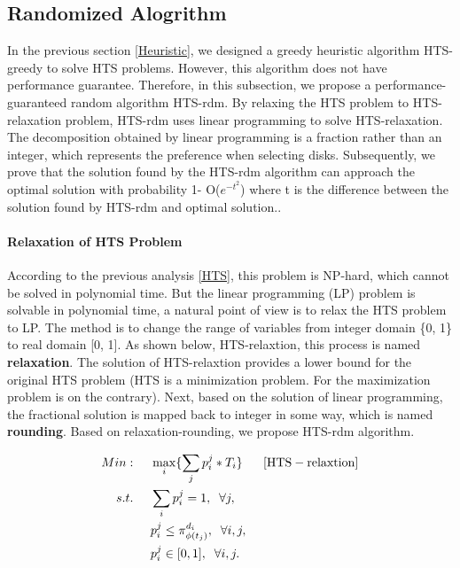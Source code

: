 \documentclass[conference]{IEEEtran}
\begin{document}
\subsection{Randomized Alogrithm}\label{Randomized}

In the previous section \ref{Heuristic}, we designed a greedy heuristic algorithm HTS-greedy to solve HTS problems. However, this algorithm does not have performance guarantee. Therefore, in this subsection, we propose a performance-guaranteed random algorithm HTS-rdm. By relaxing the HTS problem to HTS-relaxation problem, HTS-rdm uses linear programming to solve HTS-relaxation. The decomposition obtained by linear programming is a fraction rather than an integer, which represents the preference when selecting disks. Subsequently, we prove that the solution found by the HTS-rdm algorithm can approach the optimal solution with probability 1- O($e^{-t^2}$) where t is the difference between the solution found by HTS-rdm and optimal solution..

\paragraph{\textbf{Relaxation of HTS Problem}} According to the previous analysis \ref{HTS}, this problem is NP-hard, which cannot be solved in polynomial time. But the linear programming (LP) problem is solvable in polynomial time, a natural point of view is to relax the HTS problem to LP. The method is to change the range of variables from integer domain \{0, 1\} to real domain [0, 1]. As shown below, HTS-relaxtion, this process is named \textbf{relaxation}. The solution of HTS-relaxtion provides a lower bound for the original HTS problem (HTS is a minimization problem. For the maximization problem is on the contrary). Next, based on the solution of linear programming, the fractional solution is mapped back to integer in some way, which is named \textbf{rounding}. Based on relaxation-rounding, we propose HTS-rdm algorithm.

 \begin{align}
 Min:&\;\;\;\;\;\max\limits_{i}\{\sum_{j}p_i^j*T_i\}\;\;\;\;\;\;[\rm{HTS-relaxtion}]\nonumber\\
 s.t. 
 &\;\;\;\;\;\sum_{i}p_i^j = 1,\;\;\forall j,\nonumber\\
 &\;\;\;\;\;p_i^j \leq \pi_{\phi(t_j)}^{d_i},\;\;\forall i,j,\nonumber\\
 &\;\;\;\;\;p_i^j \in[0, 1],\;\;\forall i,j.\nonumber
 \end{align}
 
\end{document}
